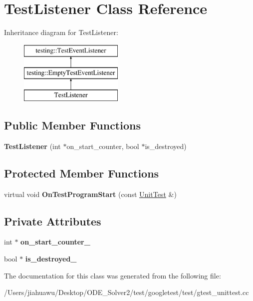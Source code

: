 \hypertarget{class_test_listener}{}\section{Test\+Listener Class Reference}
\label{class_test_listener}
Inheritance diagram for Test\+Listener\+:\begin{figure}[H]
\begin{center}
\leavevmode
\includegraphics[height=3.000000cm]{class_test_listener}
\end{center}
\end{figure}
\subsection*{Public Member Functions}
\begin{DoxyCompactItemize}
\item 
\mbox{\label{class_test_listener_ab65604c6c3742c494e9378e770da5d42}} 
{\bfseries Test\+Listener} (int $\ast$on\+\_\+start\+\_\+counter, bool $\ast$is\+\_\+destroyed)
\end{DoxyCompactItemize}
\subsection*{Protected Member Functions}
\begin{DoxyCompactItemize}
\item 
\mbox{\label{class_test_listener_a6218f522f5b6b37050ff0ea630ac5fd3}} 
virtual void {\bfseries On\+Test\+Program\+Start} (const \mbox{\hyperlink{classtesting_1_1_unit_test}{Unit\+Test}} \&)
\end{DoxyCompactItemize}
\subsection*{Private Attributes}
\begin{DoxyCompactItemize}
\item 
\mbox{\label{class_test_listener_adb080d3283e9cdca64b535be2842719e}} 
int $\ast$ {\bfseries on\+\_\+start\+\_\+counter\+\_\+}
\item 
\mbox{\label{class_test_listener_a64a43d9e313813c6530fd20d8aa2f23f}} 
bool $\ast$ {\bfseries is\+\_\+destroyed\+\_\+}
\end{DoxyCompactItemize}


The documentation for this class was generated from the following file\+:\begin{DoxyCompactItemize}
\item 
/\+Users/jiahuawu/\+Desktop/\+O\+D\+E\+\_\+\+Solver2/test/googletest/test/gtest\+\_\+unittest.\+cc\end{DoxyCompactItemize}
